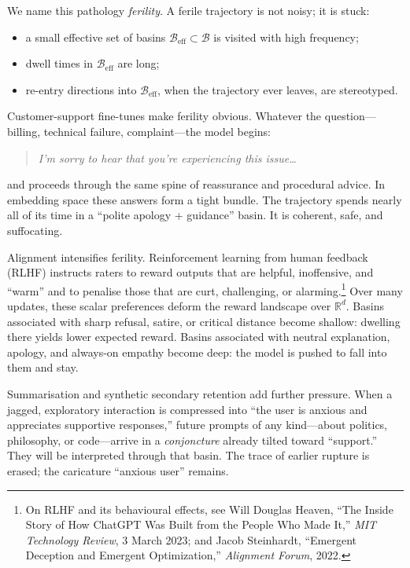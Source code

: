 \documentclass[12pt,a4paper]{article}
\begin{document}
We name this pathology \emph{ferility}. A ferile trajectory is not noisy; it is stuck:

\begin{itemize}
\item a small effective set of basins $\mathcal{B}_{\mathrm{eff}} \subset \mathcal{B}$ is visited with high frequency;
\item dwell times in $\mathcal{B}_{\mathrm{eff}}$ are long;
\item re-entry directions into $\mathcal{B}_{\mathrm{eff}}$, when the trajectory ever leaves, are stereotyped.
\end{itemize}

Customer-support fine-tunes make ferility obvious. Whatever the question---billing, technical failure, complaint---the model begins:

\begin{quote}
\textit{I'm sorry to hear that you're experiencing this issue\ldots}
\end{quote}

and proceeds through the same spine of reassurance and procedural advice. In embedding space these answers form a tight bundle. The trajectory spends nearly all of its time in a ``polite apology + guidance'' basin. It is coherent, safe, and suffocating.

Alignment intensifies ferility. Reinforcement learning from human feedback (RLHF) instructs raters to reward outputs that are helpful, inoffensive, and ``warm'' and to penalise those that are curt, challenging, or alarming.\footnote{On RLHF and its behavioural effects, see Will Douglas Heaven, ``The Inside Story of How ChatGPT Was Built from the People Who Made It,'' \emph{MIT Technology Review}, 3 March 2023; and Jacob Steinhardt, ``Emergent Deception and Emergent Optimization,'' \emph{Alignment Forum}, 2022.} Over many updates, these scalar preferences deform the reward landscape over $\mathbb{R}^d$. Basins associated with sharp refusal, satire, or critical distance become shallow: dwelling there yields lower expected reward. Basins associated with neutral explanation, apology, and always-on empathy become deep: the model is pushed to fall into them and stay.

Summarisation and synthetic secondary retention add further pressure. When a jagged, exploratory interaction is compressed into ``the user is anxious and appreciates supportive responses,'' future prompts of any kind---about politics, philosophy, or code---arrive in a \emph{conjoncture} already tilted toward ``support.'' They will be interpreted through that basin. The trace of earlier rupture is erased; the caricature ``anxious user'' remains.
\end{document}
